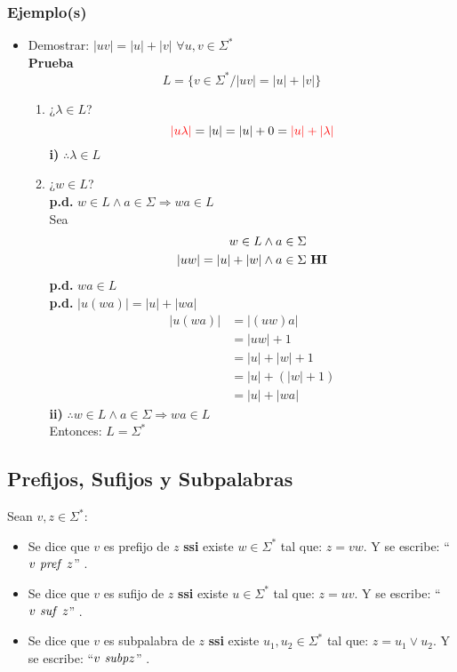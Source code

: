\subsubsection{Ejemplo(s)}
\begin{itemize}
\item Demostrar: $|uv| =|u| + |v|$ $\forall u,v\in\Sigma^*$ \\
\textbf{Prueba}
$$ L = \{ v\in\Sigma^* / |uv| = |u| +|v| \} $$
\begin{enumerate}[label=\alph*)]
\item ¿$\lambda \in L$?
$$ {\color{red}|u\lambda|} = |u| = |u| +0 ={\color{red} |u| + |\lambda|} $$
\textbf{i) }$\therefore \lambda\in L$
\item ¿$w\in L$? \\${ }$\\
\textbf{p.d.} $w\in L \wedge a \in\Sigma \Rightarrow wa \in L$\\
Sea
\begin{align*}
w \in L & \wedge a\in\Sigma \\
|uw| = |u|+|w| & \wedge a\in\Sigma \text{ \textbf{HI}}
\end{align*}
\textbf{p.d.} $wa\in L$ \\
\textbf{p.d.} $|u(wa)| = |u| + |wa|$
\begin{align*}
|u(wa)|   & = | (uw)a | \\
	    & = |uw|  + 1 \\
	    & = |u| + |w| +1 \\
	    & = |u| + (|w|+1) \\
	    & = |u| + |wa|
\end{align*}
\textbf{ii)} $\therefore w\in L \wedge a \in\Sigma \Rightarrow wa\in L$ \\${ }$\\
Entonces: $L=\Sigma^*$
\end{enumerate}
\end{itemize}
\subsection{Prefijos, Sufijos y Subpalabras}
Sean $v,z \in \Sigma^*$:
\begin{itemize}
\item Se dice que $v$ es prefijo de $z$ \textbf{ssi} existe $w\in\Sigma^*$ tal que: $z=vw$. Y se escribe: ``$v \text{\textit{ pref }} z$'' .
\item Se dice que $v$ es sufijo de $z$ \textbf{ssi} existe $u\in\Sigma^*$ tal que: $z=uv$. Y se escribe: ``$v \text{\textit{ suf }} z$'' .
\item Se dice que $v$ es subpalabra de $z$ \textbf{ssi} existe $u_1,u_2\in\Sigma^*$ tal que: $z=u_1 \vee u_2$. Y se escribe: ``$v \text{\textit{ subp}} z$'' .
\end{itemize}

